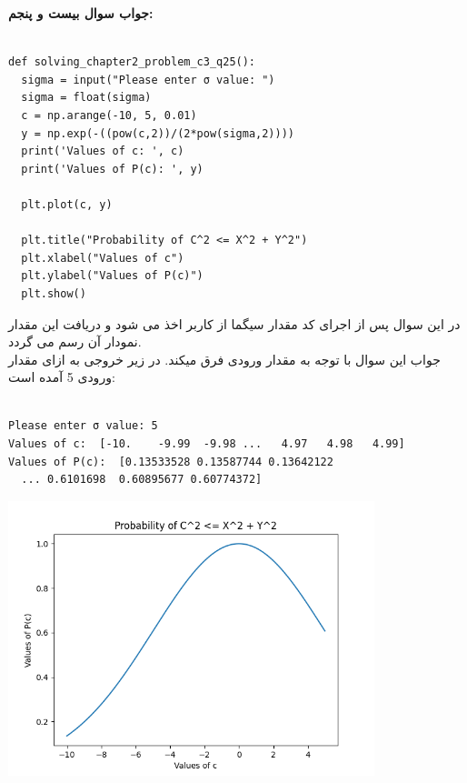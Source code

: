 \documentclass[a4paper,14pt]{article}
\begin{document}
\textbf{جواب سوال بیست و پنجم:}\\


\fontsize{11}{11}\selectfont
\begin{latin}
	\begin{lstlisting}

def solving_chapter2_problem_c3_q25():
  sigma = input("Please enter σ value: ")
  sigma = float(sigma)
  c = np.arange(-10, 5, 0.01)
  y = np.exp(-((pow(c,2))/(2*pow(sigma,2))))
  print('Values of c: ', c)
  print('Values of P(c): ', y)

  plt.plot(c, y)

  plt.title("Probability of C^2 <= X^2 + Y^2")
  plt.xlabel("Values of c")
  plt.ylabel("Values of P(c)")
  plt.show()

	\end{lstlisting}
\end{latin}
\fontsize{14}{14}\selectfont

در این سوال پس از اجرای کد مقدار سیگما از کاربر اخذ می شود و دریافت این مقدار نمودار آن رسم می گردد.\\

جواب این سوال با توجه به مقدار ورودی فرق میکند. در زیر خروجی به ازای مقدار ورودی 5 آمده است:\\
\fontsize{11}{11}\selectfont
\begin{latin}
	\begin{lstlisting}

Please enter σ value: 5
Values of c:  [-10.    -9.99  -9.98 ...   4.97   4.98   4.99]
Values of P(c):  [0.13533528 0.13587744 0.13642122 
  ... 0.6101698  0.60895677 0.60774372]

	\end{lstlisting}
\end{latin}
\fontsize{14}{14}\selectfont

\begin{center}
	\includegraphics[width=0.8\textwidth]{pic13.png}
\end{center}
\end{document}
